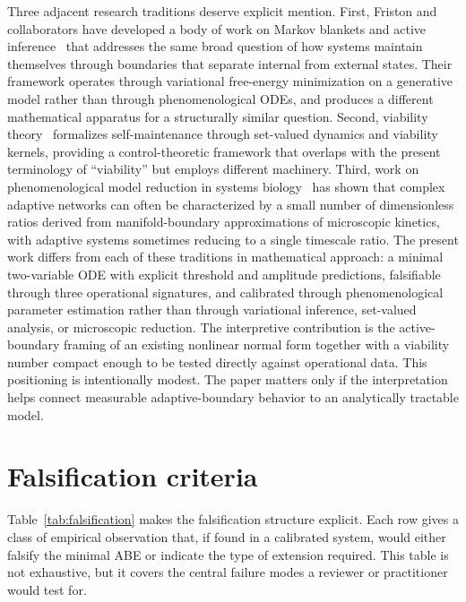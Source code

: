 \documentclass[11pt]{article}
\begin{document}
Three adjacent research traditions deserve explicit mention. First, Friston and collaborators have developed a body of work on Markov blankets and active inference~\cite{friston2013life,kirchhoff2018markov} that addresses the same broad question of how systems maintain themselves through boundaries that separate internal from external states. Their framework operates through variational free-energy minimization on a generative model rather than through phenomenological ODEs, and produces a different mathematical apparatus for a structurally similar question. Second, viability theory~\cite{aubin1991viability} formalizes self-maintenance through set-valued dynamics and viability kernels, providing a control-theoretic framework that overlaps with the present terminology of ``viability'' but employs different machinery. Third, work on phenomenological model reduction in systems biology~\cite{transtrum2015perspective,daniels2015automated} has shown that complex adaptive networks can often be characterized by a small number of dimensionless ratios derived from manifold-boundary approximations of microscopic kinetics, with adaptive systems sometimes reducing to a single timescale ratio. The present work differs from each of these traditions in mathematical approach: a minimal two-variable ODE with explicit threshold and amplitude predictions, falsifiable through three operational signatures, and calibrated through phenomenological parameter estimation rather than through variational inference, set-valued analysis, or microscopic reduction. The interpretive contribution is the active-boundary framing of an existing nonlinear normal form together with a viability number compact enough to be tested directly against operational data. This positioning is intentionally modest. The paper matters only if the interpretation helps connect measurable adaptive-boundary behavior to an analytically tractable model.

\clearpage
\section{Falsification criteria}
Table~\ref{tab:falsification} makes the falsification structure explicit. Each row gives a class of empirical observation that, if found in a calibrated system, would either falsify the minimal ABE or indicate the type of extension required. This table is not exhaustive, but it covers the central failure modes a reviewer or practitioner would test for.
\end{document}
